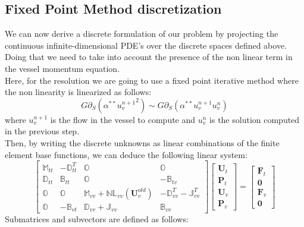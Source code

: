 \documentclass[a4paper]{report}
\begin{document}
\subsection{ Fixed Point Method discretization}
We can now derive a discrete formulation of our problem by projecting the continuous infinite-dimensional PDE's over the discrete spaces defined above. Doing that we need to take into account the presence of the non linear term in the vessel momentum equation.\\
Here, for the resolution we are going to use a fixed point iterative method where the non linearity is linearized as follows:
\begin{equation}
G \partial_S (\alpha^{**}{u_v^{n+1}}^2)\sim G \partial_S (\alpha^{**}u_v^{n+1} u_v^{n})
\end{equation}
where $u_v^{n+1} $ is the flow in the vessel to compute and $u_v^n$ is the solution computed in the previous step.\\
Then, by writing the discrete unknowns as linear combinations of the finite element base functions, we can deduce the following linear system:
\begin{equation}
\begin{bmatrix}
\mathbb{M}_{tt} & -\mathbb{D}_{tt}^T & \mathbb{O} & \mathbb{O} \\
\mathbb{D}_{tt} & \mathbb{B}_{tt} &\mathbb{O} & -\mathbb{B}_{tv}\\
\mathbb{O} & \mathbb{O} & \mathbb{M}_{vv} + \mathbb{NL}_{vv}(\mathbf{U}_v^{old}) & -\mathbb{D}_{vv}^T - \mathbb{J}_{vv}^T\\
\mathbb{O} & -\mathbb{B}_{vt} & \mathbb{D}_{vv} + \mathbb{J}_{vv} & \mathbb{B}_{vv}
\end{bmatrix}\left[
\begin{array}{c}
\mathbf{U}_t \\ \mathbf{P}_t \\ \mathbf{U}_v \\ \mathbf{P}_v
\end{array} \right]
=\left[
\begin{array}{c}
\mathbf{F}_t \\ \mathbf{0} \\ \mathbf{F}_v \\ \mathbf{0}
\end{array}
\right]
\end{equation}
Submatrices and subvectors are defined as follows:
\end{document}
